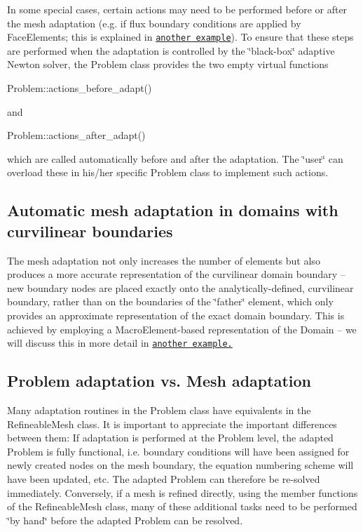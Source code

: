 In some special cases, certain actions may need to be performed before or after the mesh adaptation (e.\+g. if flux boundary conditions are applied by {\ttfamily Face\+Elements}; this is explained in \href{../../../poisson/two_d_poisson_flux_bc_adapt/html/index.html}{\tt another example}). To ensure that these steps are performed when the adaptation is controlled by the \char`\"{}black-\/box\char`\"{} adaptive Newton solver, the {\ttfamily Problem} class provides the two empty virtual functions 
\begin{DoxyCode}
Problem::actions\_before\_adapt()
\end{DoxyCode}
 and 
\begin{DoxyCode}
Problem::actions\_after\_adapt()
\end{DoxyCode}
 which are called automatically before and after the adaptation. The \char`\"{}user\char`\"{} can overload these in his/her specific {\ttfamily Problem} class to implement such actions.\hypertarget{index_how_to}{}\subsection{Automatic mesh adaptation in domains with curvilinear boundaries}\label{index_how_to}
The mesh adaptation not only increases the number of elements but also produces a more accurate representation of the curvilinear domain boundary -- new boundary nodes are placed exactly onto the analytically-\/defined, curvilinear boundary, rather than on the boundaries of the \char`\"{}father\char`\"{} element, which only provides an approximate representation of the exact domain boundary. This is achieved by employing a {\ttfamily Macro\+Element-\/based} representation of the {\ttfamily Domain} -- we will discuss this in more detail in \href{../../../poisson/fish_poisson2/html/index.html}{\tt another example.}\hypertarget{index_problem_vs_mesh}{}\subsection{Problem adaptation vs. Mesh adaptation}\label{index_problem_vs_mesh}
Many adaptation routines in the {\ttfamily Problem} class have equivalents in the {\ttfamily Refineable\+Mesh} class. It is important to appreciate the important differences between them\+: If adaptation is performed at the {\ttfamily Problem} level, the adapted {\ttfamily Problem} is fully functional, i.\+e. boundary conditions will have been assigned for newly created nodes on the mesh boundary, the equation numbering scheme will have been updated, etc. The adapted {\ttfamily Problem} can therefore be re-\/solved immediately. Conversely, if a mesh is refined directly, using the member functions of the {\ttfamily Refineable\+Mesh} class, many of these additional tasks need to be performed \char`\"{}by hand\char`\"{} before the adapted {\ttfamily Problem} can be resolved.



